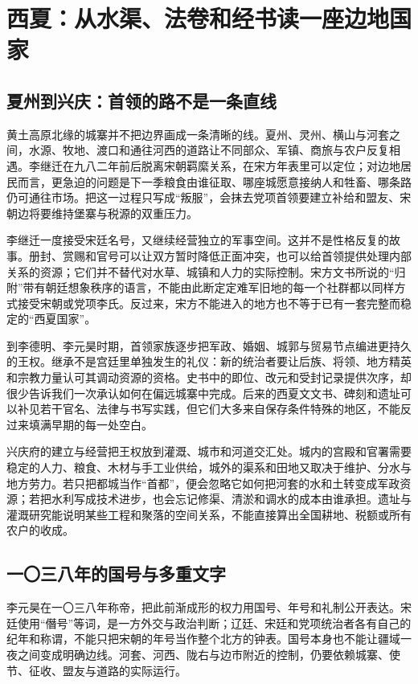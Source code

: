 \section{西夏：从水渠、法卷和经书读一座边地国家}

\subsection{夏州到兴庆：首领的路不是一条直线}

黄土高原北缘的城寨并不把边界画成一条清晰的线。夏州、灵州、横山与河套之间，水源、牧地、渡口和通往河西的道路让不同部众、军镇、商旅与农户反复相遇。李继迁在九八二年前后脱离宋朝羁縻关系，在宋方年表里可以定位；对边地居民而言，更急迫的问题是下一季粮食由谁征取、哪座城愿意接纳人和牲畜、哪条路仍可通往市场。把这一过程只写成“叛服”，会抹去党项首领要建立补给和盟友、宋朝边将要维持堡寨与税源的双重压力。

李继迁一度接受宋廷名号，又继续经营独立的军事空间。这并不是性格反复的故事。册封、赏赐和官号可以让双方暂时降低正面冲突，也可以给首领提供处理内部关系的资源；它们并不替代对水草、城镇和人力的实际控制。宋方文书所说的“归附”带有朝廷想象秩序的语言，不能由此断定定难军旧地的每一个社群都以同样方式接受宋朝或党项李氏。反过来，宋方不能进入的地方也不等于已有一套完整而稳定的“西夏国家”。

到李德明、李元昊时期，首领家族逐步把军政、婚姻、城郭与贸易节点编进更持久的王权。继承不是宫廷里单独发生的礼仪：新的统治者要让后族、将领、地方精英和宗教力量认可其调动资源的资格。史书中的即位、改元和受封记录提供次序，却很少告诉我们一次承认如何在偏远城寨中完成。后来的西夏文文书、碑刻和遗址可以补见若干官名、法律与书写实践，但它们大多来自保存条件特殊的地区，不能反过来填满早期的每一处空白。

兴庆府的建立与经营把王权放到灌溉、城市和河道交汇处。城内的宫殿和官署需要稳定的人力、粮食、木材与手工业供给，城外的渠系和田地又取决于维护、分水与地方劳力。若只把都城当作“首都”，便会忽略它如何把河套的水和土转变成军政资源；若把水利写成技术进步，也会忘记修渠、清淤和调水的成本由谁承担。遗址与灌溉研究能说明某些工程和聚落的空间关系，不能直接算出全国耕地、税额或所有农户的收成。

\subsection{一〇三八年的国号与多重文字}

李元昊在一〇三八年称帝，把此前渐成形的权力用国号、年号和礼制公开表达。宋廷使用“僭号”等词，是一方外交与政治判断；辽廷、宋廷和党项统治者各有自己的纪年和称谓，不能只把宋朝的年号当作整个北方的钟表。国号本身也不能让疆域一夜之间变成明确边线。河套、河西、陇右与边市附近的控制，仍要依赖城寨、使节、征收、盟友与道路的实际运行。

